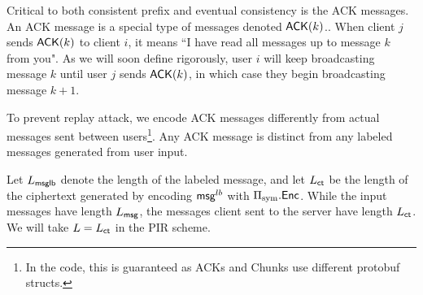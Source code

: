 Critical to both consistent prefix and eventual consistency is the ACK messages. An ACK message is a special type of messages denoted $\mathsf{ACK}(k)$.. When client $j$ sends $\mathsf{ACK}(k)$ to client $i$, it means ``I have read all messages up to message $k$ from you". As we will soon define rigorously, user $i$ will keep broadcasting message $k$ until user $j$ sends $\mathsf{ACK}(k)$, in which case they begin broadcasting message $k + 1$. 

To prevent replay attack, we encode ACK messages differently from actual messages sent between users\footnote{In the code, this is guaranteed as ACKs and Chunks use different protobuf structs.}. Any ACK message is distinct from any labeled messages generated from user input.

Let $L_{\mathsf{msglb}}$ denote the length of the labeled message, and let $L_{\mathsf{ct}}$ be the length of the ciphertext generated by encoding $\mathsf{msg}^{lb}$ with $\Pi_{\text{sym}}.\mathsf{Enc}$. While the input messages have length $L_{\mathsf{msg}}$, the messages client sent to the server have length $L_{\mathsf{ct}}$. We will take $L = L_{\mathsf{ct}}$ in the PIR scheme.
